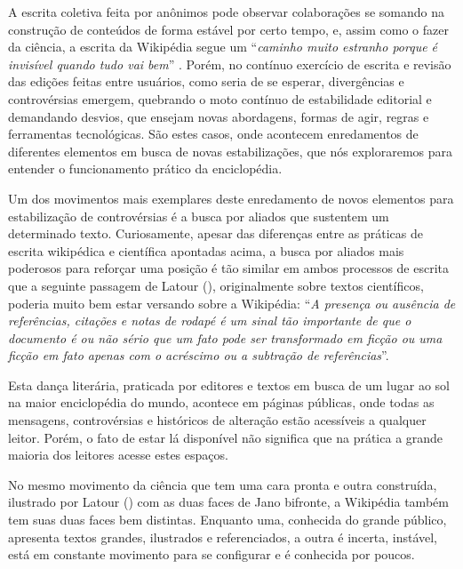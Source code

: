 A escrita coletiva feita por anônimos pode observar colaborações se somando na construção de conteúdos de forma estável por certo tempo, e, assim como o fazer da ciência, a escrita da Wikipédia segue um ``\textit{caminho muito estranho porque é invisível quando tudo vai bem}'' \citep[p.44]{latour_cogitamus_2010}. Porém, no contínuo exercício de escrita e revisão das edições feitas entre usuários, como seria de se esperar, divergências e controvérsias emergem, quebrando o moto contínuo de estabilidade editorial e demandando desvios, que ensejam novas abordagens, formas de agir, regras e ferramentas tecnológicas. São estes casos, onde acontecem enredamentos de diferentes elementos em busca de novas estabilizações, que nós exploraremos para entender o funcionamento prático da enciclopédia.

Um dos movimentos mais exemplares deste enredamento de novos elementos para estabilização de controvérsias é a busca por aliados que sustentem um determinado texto. Curiosamente, apesar das diferenças entre as práticas de escrita wikipédica e científica apontadas acima, a busca por aliados mais poderosos para reforçar uma posição é tão similar em ambos processos de escrita que a seguinte passagem de Latour (\citeyear[p.48]{latour_cogitamus_2010}), originalmente sobre textos científicos, poderia muito bem estar versando sobre a Wikipédia: ``\textit{A presença ou ausência de referências, citações e notas de rodapé é um sinal tão importante de que o documento é ou não sério que um fato pode ser transformado em ficção ou uma ficção em fato apenas com o acréscimo ou a subtração de referências}''.

Esta dança literária, praticada por editores e textos em busca de um lugar ao sol na maior enciclopédia do mundo, acontece em páginas públicas, onde todas as mensagens, controvérsias e históricos de alteração estão acessíveis a qualquer leitor. Porém, o fato de estar lá disponível não significa que na prática a grande maioria dos leitores acesse estes espaços.

No mesmo movimento da ciência que tem uma cara pronta e outra construída, ilustrado por Latour (\citeyear{latour_ciencia_1987}) com as duas faces de Jano bifronte, a Wikipédia também tem suas duas faces bem distintas. Enquanto uma, conhecida do grande público, apresenta textos grandes, ilustrados e referenciados, a outra é incerta, instável, está em constante movimento para se configurar e é conhecida por poucos.

